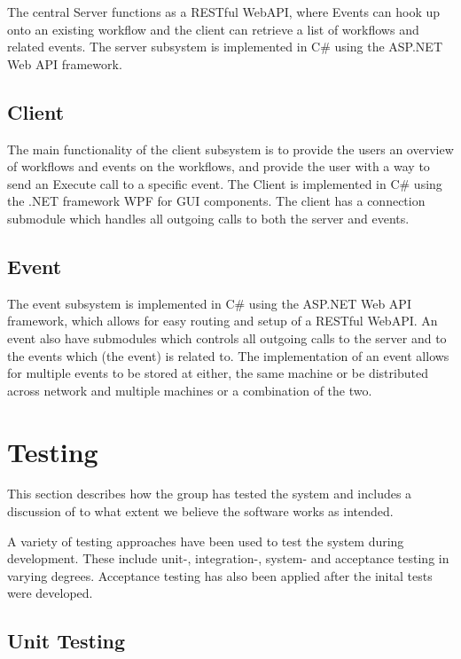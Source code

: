 The central Server functions as a RESTful WebAPI, where Events can hook
up onto an existing workflow and the client can retrieve a list of
workflows and related events. The server subsystem is implemented in C\#
using the ASP.NET Web API framework.

\section{Client}\label{client}

The main functionality of the client subsystem is to provide the users
an overview of workflows and events on the workflows, and provide the
user with a way to send an Execute call to a specific event. The Client
is implemented in C\# using the .NET framework WPF for GUI components.
The client has a connection submodule which handles all outgoing calls
to both the server and events.

\section{Event}\label{event}

The event subsystem is implemented in C\# using the ASP.NET Web API
framework, which allows for easy routing and setup of a RESTful WebAPI.
An event also have submodules which controls all outgoing calls to the
server and to the events which (the event) is related to. The
implementation of an event allows for multiple events to be stored at
either, the same machine or be distributed across network and multiple
machines or a combination of the two.

\chapter{Testing}\label{testing}

This section describes how the group has tested the system and includes
a discussion of to what extent we believe the software works as
intended.

A variety of testing approaches have been used to test the system during
development. These include unit-, integration-, system- and acceptance
testing in varying degrees. Acceptance testing has also been applied
after the inital tests were developed.

\section{Unit Testing}\label{unit-testing}

